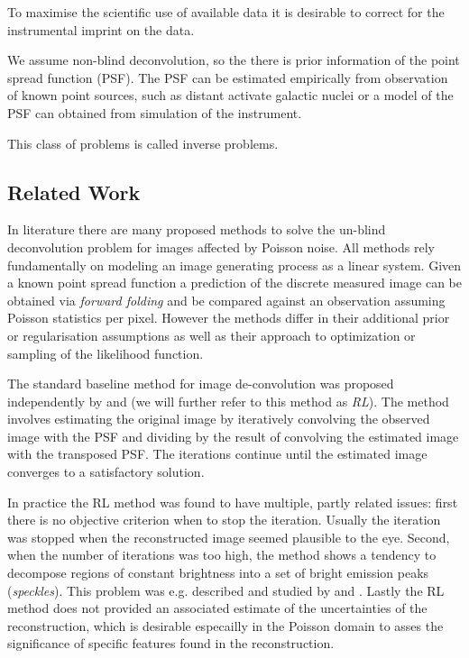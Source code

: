 \documentclass[twocolumn]{aastex631}
\begin{document}
    To maximise the scientific use of available data it is desirable to correct for the instrumental imprint on the data. 
    
    We assume non-blind deconvolution, so the there is prior information of the point spread function (PSF). The PSF can be estimated empirically from observation of known point sources, such as distant activate galactic nuclei or a model of the PSF can obtained from simulation of the instrument. 
    
    This class of problems is called inverse problems.
    
    \subsection{Related Work}
    In literature there are many proposed methods to solve the un-blind deconvolution problem for images affected by Poisson noise. All methods rely fundamentally on modeling an image generating process as a linear system. Given a known point spread function a prediction of the discrete measured image can be obtained via \textit{forward folding} and be compared against an observation assuming Poisson statistics per pixel. However the methods differ in their additional prior or regularisation assumptions as well as their approach to optimization or sampling of the likelihood function.
    
    The standard baseline method for image de-convolution was proposed independently by \cite{Richardson1972} and \cite{Lucy1974} (we will further refer to this method as \textit{RL}). The method involves estimating the original image by iteratively convolving the observed image with the PSF and dividing by the result of convolving the estimated image with the transposed PSF. The iterations continue until the estimated image converges to a satisfactory solution. 

    In practice the RL method was found to have multiple, partly related issues: first there is no objective criterion when to stop the iteration. Usually the iteration was stopped when the reconstructed image seemed plausible to the eye. Second, when the number of iterations was too high, the method shows a tendency to decompose regions of constant brightness into a set of bright emission peaks (\textit{speckles}). This problem was e.g. described and studied by \cite{Reeves1995} and \cite{Fish1995}. Lastly the RL method does not provided an associated estimate of the uncertainties of the reconstruction, which is desirable especailly in the Poisson domain to asses the significance of specific features found in the reconstruction.
    
\end{document}
